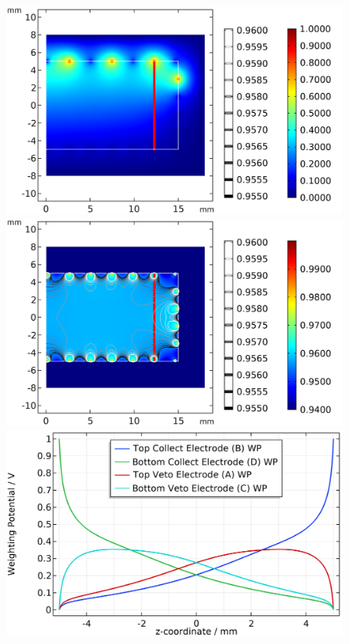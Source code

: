 \begin{figure}
\begin{minipage}{0.48\textwidth}
\end{minipage}
\hfill\vline\hfill
\begin{minipage}{0.48\textwidth}
\centering
\includegraphics[scale=0.5]{Figures/Electrodes/fid38_swp.png}
\includegraphics[scale=0.5]{Figures/Electrodes/fid38_twp.png}
\includegraphics[scale=0.5]{Figures/Electrodes/fid38_wp_plot.png}

\end{minipage}
\end{figure}
